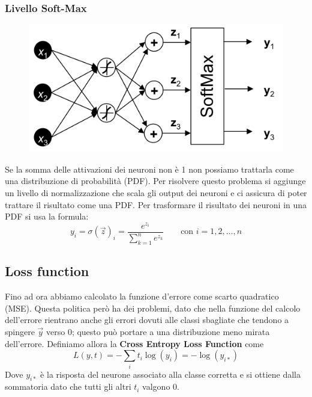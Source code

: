 \subsubsection{Livello Soft-Max}
\begin{figure}
	\vspace{-.8cm}
	\centering
	\includegraphics[width=.95\linewidth]{Picture/Multiclass_Soft_Max}
\end{figure}
Se la somma delle attivazioni dei neuroni non è 1 non possiamo trattarla come una distribuzione di probabilità (PDF). Per risolvere questo problema si aggiunge un livello di normalizzazione che scala gli output dei neuroni e ci assicura di poter trattare il risultato come una PDF.  Per trasformare il risultato dei neuroni in una PDF si usa la formula:
\begin{equation}
	y_i= \sigma(\vec{z})_i = \frac{e^{z_i}}{\sum_{k = 1}^{n} e^{z_k}}  \qquad\text{con } i = 1, 2, \dots, n 
\end{equation}



\subsection{Loss function}
Fino ad ora abbiamo calcolato la funzione d'errore come scarto quadratico (MSE).  Questa politica però ha dei problemi, dato che nella funzione del calcolo dell'errore rientrano anche gli errori dovuti alle classi sbagliate che tendono a spingere $\vec{y}$ verso 0; questo può portare a una distribuzione meno mirata dell'errore.
Definiamo allora la \textbf{Cross Entropy Loss Function} come
\begin{equation}
	L(y, t) = - \sum_i t_i \log(y_i) = - \log(y_{i*})
\end{equation}
Dove $y_{i*}$ è la risposta del neurone associato alla classe corretta e si ottiene dalla sommatoria dato che tutti gli altri $t_i$ valgono 0.

